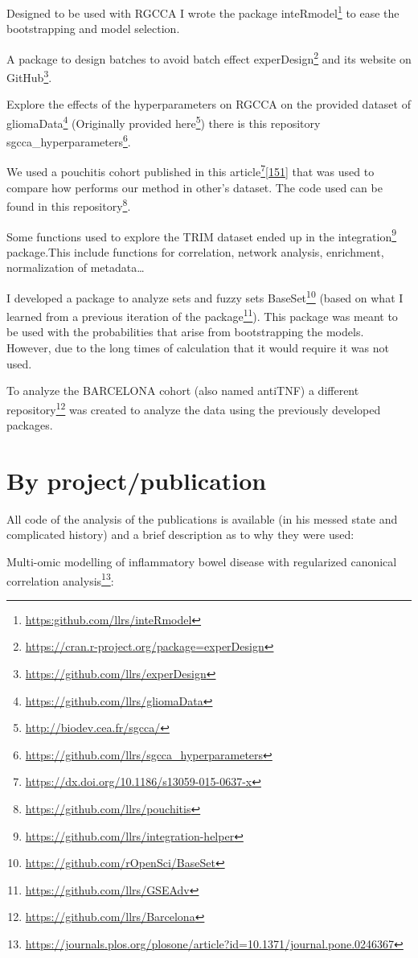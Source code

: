 \documentclass[
  a4paper,
]{book}
\DeclareRobustCommand{\href}[2]{#2\footnote{\url{#1}}}
\begin{document}
Designed to be used with RGCCA I wrote the package \href{https:github.com/llrs/inteRmodel}{inteRmodel} to ease the bootstrapping and model selection.

A package to design batches to avoid batch effect \href{https://cran.r-project.org/package=experDesign}{experDesign} and its website on \href{https://github.com/llrs/experDesign}{GitHub}.

Explore the effects of the hyperparameters on RGCCA on the provided dataset of \href{https://github.com/llrs/gliomaData}{gliomaData} (Originally provided \href{http://biodev.cea.fr/sgcca/}{here}) there is this repository \href{https://github.com/llrs/sgcca_hyperparameters}{sgcca\_hyperparameters}.

We used a pouchitis cohort published in this \href{https://dx.doi.org/10.1186/s13059-015-0637-x}{article}{[}\protect\hyperlink{ref-morgan2015}{151}{]} that was used to compare how performs our method in other's dataset.
The code used can be found in \href{https://github.com/llrs/pouchitis}{this repository}.

Some functions used to explore the TRIM dataset ended up in the \href{https://github.com/llrs/integration-helper}{integration} package.This include functions for correlation, network analysis, enrichment, normalization of metadata\ldots{}

I developed a package to analyze sets and fuzzy sets \href{https://github.com/rOpenSci/BaseSet}{BaseSet} (based on what I learned from a previous iteration of the \href{https://github.com/llrs/GSEAdv}{package}).
This package was meant to be used with the probabilities that arise from bootstrapping the models.
However, due to the long times of calculation that it would require it was not used.

To analyze the BARCELONA cohort (also named antiTNF) a \href{https://github.com/llrs/Barcelona}{different repository} was created to analyze the data using the previously developed packages.

\hypertarget{by-projectpublication}{%
\section{By project/publication}\label{by-projectpublication}}

All code of the analysis of the publications is available (in his messed state and complicated history) and a brief description as to why they were used:

\href{https://journals.plos.org/plosone/article?id=10.1371/journal.pone.0246367}{Multi-omic modelling of inflammatory bowel disease with regularized canonical correlation analysis}:
\end{document}
